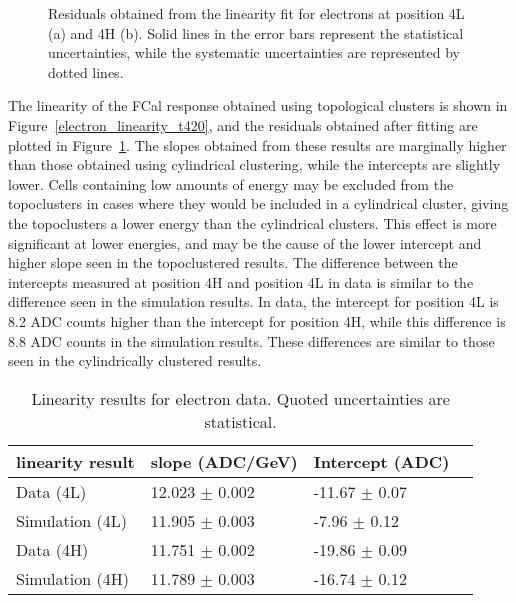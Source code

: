\begin{figure}[tbp]
\begin{center}
\end{center}
\caption[Electron linearity residuals, topoclusters]{Residuals obtained from the linearity fit for electrons at position 4L (a) and 4H (b). Solid lines in the error bars represent the statistical uncertainties, while the systematic uncertainties are represented by dotted lines. }
\label{TBplot_electron_residuals_t420}
\end{figure}
The linearity of the FCal response obtained using topological clusters is shown in Figure~\ref{electron_linearity_t420}, and the residuals obtained after fitting are plotted in Figure~\ref{TBplot_electron_residuals_t420}. The slopes obtained from these results are marginally higher than those obtained using cylindrical clustering, while the intercepts are slightly lower. Cells containing low amounts of energy may be excluded from the topoclusters in cases where they would be included in a cylindrical cluster, giving the topoclusters a lower energy than the cylindrical clusters. This effect is more significant at lower energies, and may be the cause of the lower intercept and higher slope seen in the topoclustered results. The difference between the intercepts measured at position 4H and position 4L in data is similar to the difference seen in the simulation results. In data, the intercept for position 4L is 8.2 ADC counts higher than the intercept for position 4H, while this difference is 8.8 ADC counts in the simulation results. These differences are similar to those seen in the cylindrically clustered results.
\begin{table}[tb]
\begin{center}
\begin{tabular}{|l|l|l|l|}
\hline
linearity result & slope (ADC/GeV)& Intercept (ADC) \\
\hline
Data (4L) & 12.023 $\pm$ 0.002 & -11.67 $\pm$ 0.07 \\
Simulation (4L) & 11.905 $\pm$ 0.003 & -7.96 $\pm$ 0.12 \\
Data (4H) & 11.751 $\pm$ 0.002 & -19.86 $\pm$ 0.09 \\
Simulation (4H) & 11.789 $\pm$ 0.003 & -16.74 $\pm$ 0.12 \\
\hline
\end{tabular}
\caption[Electron linearity results, topoclusters]{Linearity results for electron data. Quoted uncertainties are statistical.}
\label{table_electron_420_linearity}
\end{center}
\end{table}
